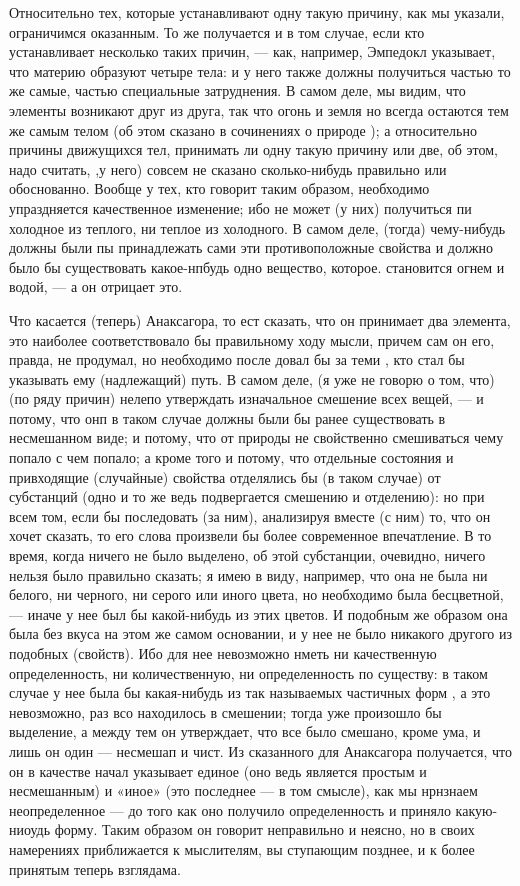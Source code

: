\documentclass{article}
\begin{document}
Относительно тех, которые устанавливают одну такую причину, как мы указали, ограничимся оказанным. То же получается и в том случае, если кто устанавливает несколько таких причин, — как, например, Эмпедокл указывает, что материю образуют четыре тела: и у него также должны получиться частью то же самые, частью специальные затруднения. В самом деле, мы видим, что элементы возникают друг из друга, так что огонь и земля но всегда остаются тем же самым телом (об этом сказано в сочинениях о природе
\footnotemark[2]
); а относительно причины движущихся тел, принимать ли одну такую причину или две, об этом, надо считать, ,у него) совсем не сказано сколько-нибудь правильно или обоснованно. Вообще у тех, кто говорит таким образом, необходимо упраздняется качественное изменение; ибо не может (у них) получиться пи холодное из теплого, ни теплое из холодного. В самом деле, (тогда) чему-нибудь должны были пы принадлежать сами эти противоположные свойства и должно было бы существовать какое-нпбудь одно вещество, которое. становится огнем и водой, — а он отрицает это.

Что касается (теперь) Анаксагора, то ест сказать, что он принимает два элемента, это наиболее соответствовало бы правильному ходу мысли, причем сам он его, правда, не продумал, но необходимо после довал бы за теми , кто стал бы указывать ему (надлежащий) путь. В самом деле, (я уже не говорю о том, что) (по ряду причин) нелепо утверждать изначальное смешение всех вещей, — и потому, что онп в таком случае должны были бы ранее существовать в несмешанном виде; и потому, что от природы не свойственно смешиваться чему попало с чем попало; а кроме того и потому, что отдельные состояния и привходящие (случайные) свойства отделялись бы (в таком случае) от субстанций (одно и то же ведь подвергается смешению и отделению): но при всем том, если бы последовать (за ним), анализируя вместе (с ним) то, что он хочет сказать, то его слова произвели бы более современное впечатление. В то время, когда ничего не было выделено, об этой субстанции, очевидно, ничего нельзя было правильно сказать; я имею в виду, например, что она не была ни белого, ни черного, ни серого или иного цвета, но необходимо была бесцветной, — иначе у нее был бы какой-нибудь из этих цветов. И подобным же образом она была без вкуса на этом же самом основании, и у нее не было никакого другого из подобных (свойств). Ибо для нее невозможно нметь ни качественную определенность, ни количественную, ни определенность по существу:
\footnotemark[3]
в таком случае у нее была бы какая-нибудь из так называемых частичных форм , а это невозможно, раз всо находилось в смешении; тогда уже произошло бы выделение, а между тем он утверждает, что все было смешано, кроме ума, и лишь он один — несмешап и чист. Из сказанного для Анаксагора получается, что он в качестве начал указывает единое (оно ведь является простым и несмешанным) и «иное» (это последнее — в том смысле), как мы
\footnotemark[4]
нрнзнаем неопределенное — до того как оно получило определенность и приняло какую-ниоудь форму. Таким образом он говорит неправильно и неясно, но в своих намерениях приближается к мыслителям, вы ступающим позднее, и к более принятым теперь взглядама.
\end{document}
